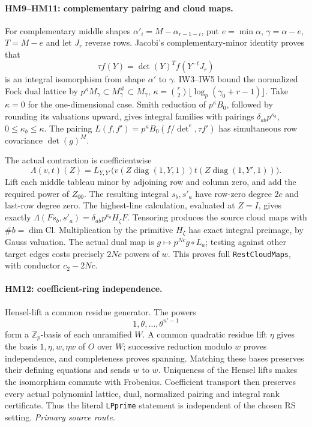 \documentclass[11pt,a4paper]{article}
\numberwithin{equation}{section}
\theoremstyle{remark}\newtheorem{remark}[theorem]{Remark}
\begin{document}
\paragraph{HM9--HM11: complementary pairing and cloud maps.}
For complementary middle shapes $\alpha'_i=M-\alpha_{r-1-i}$, put
$e=\min\alpha$, $\gamma=\alpha-e$, $T=M-e$ and let $J_r$ reverse rows.
Jacobi's complementary-minor identity proves that
\[
 \tau f(Y)=\det(Y)^T f(Y^{-t}J_r)                      \tag{HM.9}
\]
is an integral isomorphism from shape $\alpha'$ to $\gamma$.
IW3--IW5 bound the normalized Fock dual lattice by
$p^\kappa M_\gamma\subset M_\gamma^\#\subset M_\gamma$,
$\kappa=\binom r2\lfloor\log_p(\gamma_0+r-1)\rfloor$.
Take $\kappa=0$ for the one-dimensional case.
Smith reduction of $p^\kappa B_0$, followed by rounding its valuations
upward, gives integral families with pairings $\delta_{ab}p^{\kappa_b}$,
$0\le\kappa_b\le\kappa$.
The pairing $L(f,f')=p^\kappa B_0(f/\det^e,\tau f')$
has simultaneous row covariance $\det(g)^M$.

The actual contraction is coefficientwise
\[
 \Lambda(v,t)(Z)=L_{Y,Y'}\bigl(v(Z\operatorname{diag}(1,Y,1))
                 t(Z\operatorname{diag}(1,Y',1))\bigr).\tag{HM.10}
\]
Lift each middle tableau minor by adjoining row and column zero,
and add the required power of $Z_{00}$. The resulting integral
$s_b,s'_a$ have row-zero degree $2c$ and last-row degree zero.
The highest-line calculation, evaluated at $Z=I$, gives exactly
$\Lambda(Fs_b,s'_a)=\delta_{ab}p^{\kappa_b}H_\zeta F$.
Tensoring produces the source cloud maps with $\#b=\dim\mathrm{Cl}$.
Multiplication by the primitive $H_\zeta$ has exact integral preimage,
by Gauss valuation. The actual dual map is
$g\mapsto p^{Nc}g\circ L_a$; testing against other target edges
costs precisely $2Nc$ powers of $w$.
This proves full \texttt{RestCloudMaps}, with conductor $c_2-2Nc$.

\paragraph{HM12: coefficient-ring independence.}
Hensel-lift a common residue generator. The powers
\[
                          1,\theta,\ldots,\theta^{n'-1}
\]
form a $\mathbb Z_p$-basis of each unramified $W$.
A common quadratic residue lift $\eta$ gives the basis
$1,\eta,w,\eta w$ of $O$ over $W$; successive reduction modulo $w$
proves independence, and completeness proves spanning.
Matching these bases preserves their defining equations and sends $w$ to $w$.
Uniqueness of the Hensel lifts makes the isomorphism commute with Frobenius.
Coefficient transport then preserves every actual polynomial lattice,
dual, normalized pairing and integral rank certificate. Thus the literal
\texttt{LPprime} statement is independent of the chosen RS setting.
\noindent\textit{Primary source route.}\cite{harmonic-cloud-actual}
\end{document}
